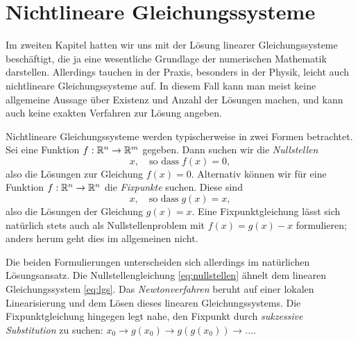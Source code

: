 % 

\chapter{Nichtlineare Gleichungssysteme}

Im zweiten Kapitel hatten wir uns mit der Lösung linearer
Gleichungssysteme beschäftigt, die ja eine wesentliche Grundlage der
numerischen Mathematik darstellen. Allerdings tauchen in der Praxis,
besonders in der Physik, leicht auch nichtlineare Gleichungssysteme
auf. In diesem Fall kann man meist keine allgemeine Aussage über
Existenz und Anzahl der Lösungen machen, und kann auch keine exakten
Verfahren zur Lösung angeben.

Nichtlineare Gleichungssysteme werden typischerweise in zwei Formen
betrachtet. Sei eine Funktion $f:\mathbb{R}^n\to\mathbb{R}^m$ gegeben. Dann suchen
wir die \emph{Nullstellen}
\begin{equation}
  \label{eq:nullstellen}
  x, \quad\text{so dass}\; f(x) = 0,
\end{equation}
also die Lösungen zur Gleichung $f(x) = 0$. Alternativ können wir für
eine Funktion $f:\mathbb{R}^n\to\mathbb{R}^n$ die \emph{Fixpunkte} suchen. Diese
sind
\begin{equation}
  \label{eq:fixpunkt}
  x, \quad\text{so dass}\; g(x) = x,
\end{equation}
also die Lösungen der Gleichung $g(x) = x$. Eine Fixpunktgleichung
lässt sich natürlich stets auch als Nullstellenproblem mit $f(x) =
g(x) - x$ formulieren; anders herum geht dies im allgemeinen nicht.

Die beiden Formulierungen unterscheiden sich allerdings im natürlichen
Lösungsansatz. Die Nullstellengleichung \eqref{eq:nullstellen} ähnelt
dem linearen Gleichungssystem \eqref{eq:lgs}. Das
\emph{Newtonverfahren} beruht auf einer lokalen Linearisierung und dem
Lösen dieses linearen Gleichungssystems. Die Fixpunktgleichung
hingegen legt nahe, den Fixpunkt durch \emph{sukzessive Substitution}
zu suchen: $x_0\to g(x_0)\to g(g(x_0))\to\ldots$.

